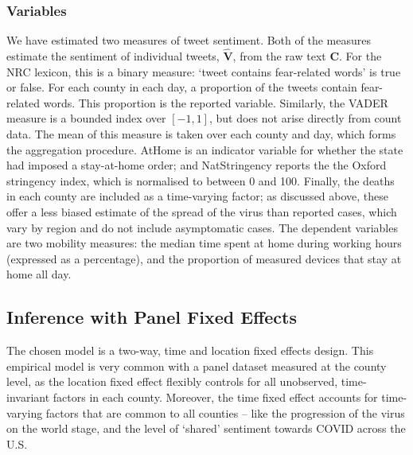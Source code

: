 \documentclass{article}
\begin{document}
\subsubsection{Variables}
We have estimated two measures of tweet sentiment. Both of the measures estimate the sentiment of individual tweets, \(\hat{\mathbf{V}}\), from the raw text \(\mathbf{C}\). For the NRC lexicon, this is a binary measure: `tweet contains fear-related words' is true or false. For each county in each day, a proportion of the tweets contain fear-related words. This proportion is the reported variable. Similarly, the VADER measure is a bounded index over \([-1,1]\), but does not arise directly from count data. The mean of this measure is taken over each county and day, which forms the aggregation procedure. AtHome is an indicator variable for whether the state had imposed a stay-at-home order; and NatStringency reports the the Oxford stringency index, which is normalised to between 0 and 100. Finally, the deaths in each county are included as a time-varying factor; as discussed above, these offer a less biased estimate of the spread of the virus than reported cases, which vary by region and do not include asymptomatic cases. The dependent variables are two mobility measures: the median time spent at home during working hours (expressed as a percentage), and the proportion of measured devices that stay at home all day.

\subsection{Inference with Panel Fixed Effects}
The chosen model is a two-way, time and location fixed effects design. This empirical model is very common with a panel dataset measured at the county level, as the location fixed effect flexibly controls for all unobserved, time-invariant factors in each county. Moreover, the time fixed effect accounts for time-varying factors that are common to all counties -- like the progression of the virus on the world stage, and the level of `shared' sentiment towards COVID across the U.S. 
\end{document}
